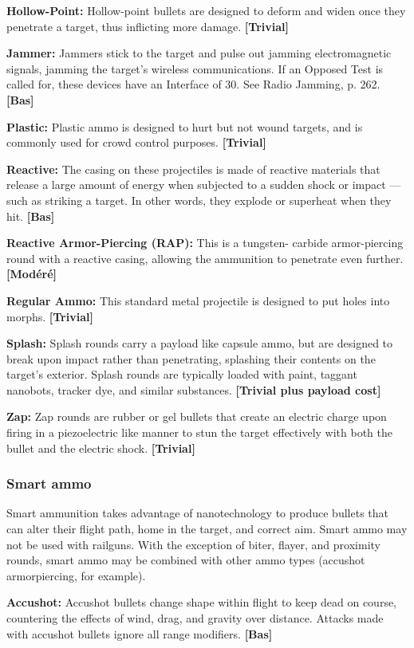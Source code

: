 {{\textbf{Hollow-Point:} Hollow-point bullets are designed to deform and widen once they penetrate a target, thus inflicting more damage. \textbf{[Trivial]} 

\textbf{Jammer:} Jammers stick to the target and pulse out jamming electromagnetic signals, jamming the target’s wireless communications. If an Opposed Test is called for, these devices have an Interface of 30. See Radio Jamming, p. 262. \textbf{[Bas]} 

\textbf{Plastic:} Plastic ammo is designed to hurt but not wound targets, and is commonly used for crowd control purposes. \textbf{[Trivial]} 

\textbf{Reactive:} The casing on these projectiles is made of reactive materials that release a large amount of energy when subjected to a sudden shock or impact --- such as striking a target. In other words, they explode or superheat when they hit. \textbf{[Bas]} 

\textbf{Reactive Armor-Piercing (RAP):} This is a tungsten- carbide armor-piercing round with a reactive casing, allowing the ammunition to penetrate even further. \textbf{[Modéré]} 

\textbf{Regular Ammo:} This standard metal projectile is designed to put holes into morphs. \textbf{[Trivial]} 

\textbf{Splash:} Splash rounds carry a payload like capsule ammo, but are designed to break upon impact rather than penetrating, splashing their contents on the target’s exterior. Splash rounds are typically loaded with paint, taggant nanobots, tracker dye, and similar substances. \textbf{[Trivial plus payload cost]} 

\textbf{Zap:} Zap rounds are rubber or gel bullets that create an electric charge upon firing in a piezoelectric like manner to stun the target effectively with both the bullet and the electric shock. \textbf{[Trivial]} 

\subsubsection{Smart ammo} 

Smart ammunition takes advantage of nanotechnology to produce bullets that can alter their flight path, home in the target, and correct aim. Smart ammo may not be used with railguns. With the exception of biter, flayer, and proximity rounds, smart ammo may be combined with other ammo types (accushot armorpiercing, for example). 

\textbf{Accushot:} Accushot bullets change shape within flight to keep dead on course, countering the effects of wind, drag, and gravity over distance. Attacks made with accushot bullets ignore all range modifiers. \textbf{[Bas]} 

}}
